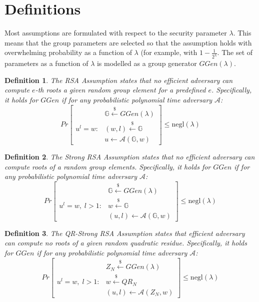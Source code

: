 \documentclass[a4paper]{article}
\newtheorem{definition}{Definition}
\begin{document}
\section{Definitions}

Most assumptions are formulated with respect to the security parameter $\lambda$. This means that the group parameters are selected so that the assumption holds with overwhelming probability as a function of $\lambda$ (for example, with $1-\frac{1}{2^{\lambda}}$. The set of parameters as a function of $\lambda$ is modelled as a group generator $GGen(\lambda)$.

\begin{definition}
The \emph{RSA Assumption} states that no
efficient adversary can compute $e$-th roots a given random group element for a predefined $e$. Specifically,
it holds for $GGen$ if for any probabilistic polynomial time adversary $\mathcal{A}$:
$$
Pr
\begin{bmatrix}
&\mathbb{G}\xleftarrow{\$}GGen(\lambda)\\
u^l = w :
& (w,l)\xleftarrow{\$}\mathbb{G}\\
&u \xleftarrow{} \mathcal{A}(\mathbb{G},w)
\end{bmatrix}\leq \mathrm{negl}(\lambda)
$$
\end{definition}

\begin{definition}
The \emph{Strong RSA Assumption} states that no
efficient adversary can compute roots of a random group elements. Specifically,
it holds for $GGen$ if for any probabilistic polynomial time adversary $\mathcal{A}$:
$$
Pr
\begin{bmatrix}
&\mathbb{G}\xleftarrow{\$}GGen(\lambda)\\
u^l = w,\; l>1 :
& w\xleftarrow{\$}\mathbb{G}\\
&(u,l) \xleftarrow{} \mathcal{A}(\mathbb{G},w)
\end{bmatrix}\leq \mathrm{negl}(\lambda)
$$
\end{definition}

\begin{definition}
The \emph{QR-Strong RSA Assumption} states that 
efficient adversary can compute no roots of a given random quadratic residue. Specifically,
it holds for $GGen$ if for any probabilistic polynomial time adversary $\mathcal{A}$:
$$
Pr
\begin{bmatrix}
&Z_N\xleftarrow{\$}GGen(\lambda)\\
u^l = w,\; l>1 :
& w\xleftarrow{\$}QR_N\\
&(u,l) \xleftarrow{} \mathcal{A}(Z_N,w)
\end{bmatrix}\leq \mathrm{negl}(\lambda)
$$
\end{definition}
\end{document}
